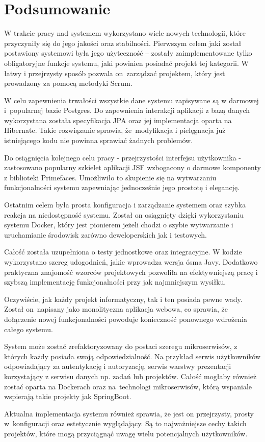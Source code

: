 \chapter{Podsumowanie}

W trakcie pracy nad systemem wykorzystano wiele nowych technologii, które przyczyniły się do jego jakości oraz stabilności. Pierwszym celem jaki został postawiony systemowi była jego użyteczność -- zostały zaimplementowane tylko obligatoryjne funkcje systemu, jaki powinien posiadać projekt tej kategorii. W łatwy i przejrzysty sposób pozwala on~zarządzać projektem, który jest prowadzony za pomocą metodyki Scrum. 

W celu zapewnienia trwałości wszystkie dane systemu zapisywane są w darmowej i~popularnej bazie Postgres. Do zapewnienia interakcji aplikacji z bazą danych wykorzystana została specyfikacja JPA oraz jej implementacja oparta na Hibernate. Takie rozwiązanie sprawia, że~modyfikacja i pielęgnacja już istniejącego kodu nie powinna sprawiać żadnych problemów.

Do osiągnięcia kolejnego celu pracy - przejrzystości interfejsu użytkownika - zastosowano popularny szkielet aplikacji JSF wzbogacony o darmowe komponenty z biblioteki Primefaces. Umożliwiło to skupienie się na wytwarzaniu funkcjonalności systemu zapewniając jednocześnie jego prostotę i elegancję.

Ostatnim celem była prosta konfiguracja i zarządzanie systemem oraz szybka reakcja na niedostępność systemu. Został on osiągnięty dzięki wykorzystaniu systemu Docker, który jest pionierem jeżeli chodzi o szybie wytwarzanie i uruchamianie środowisk zarówno deweloperskich jak i testowych. 

Całość została uzupełniona o testy jednostkowe oraz integracyjne. W kodzie wykorzystano szereg udogodnień, jakie wprowadza wersja ósma Javy. Dodatkowo praktyczna znajomość wzorców projektowych pozwoliła na efektywniejszą pracę i szybszą implementację funkcjonalności przy jak najmniejszym wysiłku.

Oczywiście, jak każdy projekt informatyczny, tak i ten posiada pewne wady. Został on~napisany jako monolityczna aplikacja webowa, co sprawia, że dołączenie nowej funkcjonalności powoduje konieczność ponownego wdrożenia całego systemu.

System może zostać zrefaktoryzowany do postaci szeregu mikroserwisów, z których każdy posiada swoją odpowiedzialność. Na przykład serwis użytkowników odpowiadający za autentykację i autoryzację, serwis warstwy prezentacji korzystający z serwisu danych np. zadań lub projektów. Całość mogłaby również zostać oparta na Dockerach oraz na~technologi mikroserwisów, którą wspaniale wspierają takie projekty jak SpringBoot.

Aktualna implementacja systemu również sprawia, że jest on przejrzysty, prosty w~konfiguracji oraz estetycznie wyglądający. Są to najważniejsze cechy takich projektów, które mogą przyciągnąć uwagę wielu potencjalnych użytkowników.